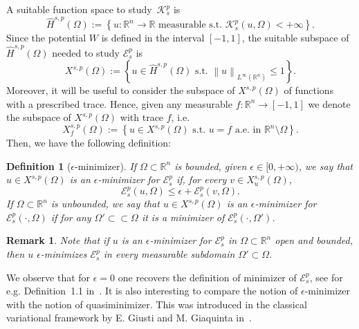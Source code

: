 \documentclass[12pt]{article}
\newcommand{\R}{\mathbb{R}}
\numberwithin{equation}{section}
\newtheorem{defn}[thm]{Definition}
\newtheorem{rem}[thm]{Remark}
\renewcommand{\leq}{\leqslant}
\begin{document}
A suitable function space to study~$\mathcal{K}_s^p$ is
\begin{equation}
\widehat{H}^{s,p}(\Omega):=\left\lbrace u:\R^n\to \R\mbox{  measurable s.t.  } \mathcal{K}_{s}^p(u,\Omega)<+\infty  \right\rbrace.
\end{equation}
Since the potential $W$ is defined in the interval $[-1,1]$, the suitable subspace of $\widehat{H}^{s,p}(\Omega)$ needed to study $\mathcal{E}_s^p$ is  
\begin{equation}\label{AdSet}
X^{s,p}(\Omega):=\left\lbrace u\in \widehat{H}^{s,p}(\Omega)\mbox{  s.t.  }\left\| u\right\|_{L^\infty(\R^n)}\leq 1\right\rbrace.
\end{equation}
Moreover, it will be useful to consider the subspace of $X^{s,p}(\Omega)$ of functions with a prescribed trace. Hence, given any measurable $f:\R^n\to [-1,1]$  we denote the subspace of $X^{s,p}(\Omega)$ with trace $f$, i.e. 
\begin{equation*}
X_f^{s,p}(\Omega):=\left\lbrace u\in X^{s,p}(\Omega)\mbox{  s.t.  }u=f\mbox{  a.e. in  }\R^n\setminus \Omega   \right\rbrace.
\end{equation*}
Then, we have the following definition:
\begin{defn}[$\epsilon$-minimizer]\label{epsilonmimimizers}
If $\Omega\subset\R^n$ is bounded, given $\epsilon\in [0,+\infty)$, we say that $u\in X^{s,p}(\Omega)$ is an $\epsilon$-minimizer for $\mathcal{E}_s^p$ if, for every $v\in X_u^{s,p}(\Omega)$,
\begin{equation*}
\mathcal{E}_s^p(u,\Omega)\leq \epsilon+\mathcal{E}_s^p(v,\Omega).
\end{equation*}
If $\Omega\subset\R^n$ is unbounded, we say that $u\in X^{s,p}(\Omega)$ is an $\epsilon$-minimizer for $\mathcal{E}_s^p(\cdot,\Omega)$ if for any $\Omega'\subset \subset \Omega$ it is a minimizer of $\mathcal{E}_s^p(\cdot,\Omega')$. 
\end{defn}
\begin{rem}\label{lfvc}
Note that if $u$ is an $\epsilon$-minimizer for $\mathcal{E}_s^p$ in $\Omega\subset\R^n$ open and bounded, then $u$ $\epsilon$-minimizes $\mathcal{E}_s^p$ in every measurable subdomain $\Omega'\subset\Omega$. 
\end{rem}
We observe that for $\epsilon=0$ one recovers the definition of minimizer of $\mathcal{E}_s^p$, see for e.g. Definition~1.1 in~\cite{DFVERPP}. It is also interesting to compare the notion of $\epsilon$-minimizer with the notion of quasiminimizer. This was introduced in the classical variational framework by E. Giusti and M. Giaquinta in~\cite{MR0666107,giaquinta1984quasi}. 
\end{document}
